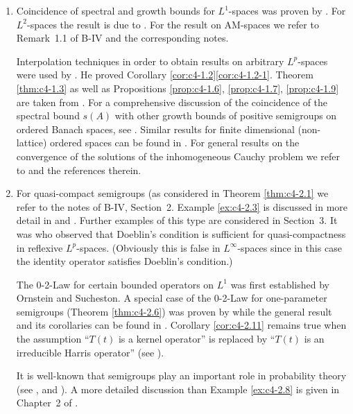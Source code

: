 \begin{enumerate}[label=\emph{Section \arabic*:}, wide, itemsep=1ex]

\item%
Coincidence of spectral and growth bounds for $L^{1}$-spaces was proven by \citet{derndinger:1980}.
For $L^{2}$-spaces the result is due to \citet{greinerNagel:1983}.
For the result on AM-spaces we refer to Remark~1.1 of B-IV and the corresponding notes.

Interpolation techniques in order to obtain results on arbitrary $L^{p}$-spaces were used by \citet{voigt:1985}.
He proved Corollary \ref{cor:c4-1.2}\ref{cor:c4-1.2-1}.
Theorem \ref{thm:c4-1.3} as well as Propositions \ref{prop:c4-1.6}, \ref{prop:c4-1.7}, \ref{prop:c4-1.9}  are taken from \citet{neubrander:1985a}.
For a comprehensive discussion of the coincidence of the spectral bound $s(A)$ with other growth bounds of positive semigroups on ordered Banach spaces, see \citet{klein:1984}.
Similar results for finite dimensional (non-lattice) ordered spaces can be found in \citet{stern:1982}.
For general results on the convergence of the solutions of the inhomogeneous Cauchy problem we refer to \citet{pazy:1983} and the references therein.

\item%
For quasi-compact semigroups (as considered in Theorem \ref{thm:c4-2.1} we refer to the notes of B-IV, Section~2.
Example \ref{ex:c4-2.3} is discussed in more detail in \citet{webb:1984} and \citet{greiner:1984}.
Further examples of this type are considered in Section~3.
It was \citet{lotz:1986} who observed that Doeblin's condition is sufficient for quasi-com\-pactness in reflexive $L^{p}$-spaces.
(Obviously this is false in $L^{\infty}$-spaces since in this case the identity operator satisfies Doeblin's condition.)

The 0-2-Law for certain bounded operators on $L^{1}$ was first established by Ornstein and Sucheston.
A special case of the 0-2-Law for one-parameter semigroups (Theorem \ref{thm:c4-2.6}) was proven by \citet{winkler:1972} while the general result and its corollaries can be found in \citet{greiner:1982}.
Corollary \ref{cor:c4-2.11} remains true when the assumption \enquote{$T(t)$ is a kernel operator} is replaced by \enquote{$T(t)$ is an irreducible Harris operator} (see \citet{lin:1983}).

It is well-known that semigroups play an important role in probability theory (\eg see \citet{dynkin:1965}, \citet{Feller:1952} and \citet{hillephillips:1957}).
A more detailed discussion than Example \ref{ex:c4-2.8} is given in Chapter~2 of \citet{vancasteren:1985}.


\end{enumerate}
